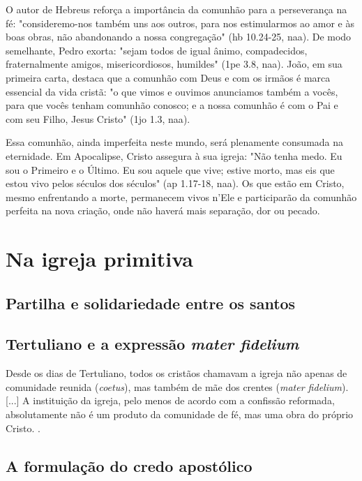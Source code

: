 O autor de Hebreus reforça a importância da comunhão para a perseverança na fé: "consideremo-nos também uns aos outros, para nos estimularmos ao amor e às boas obras, não abandonando a nossa congregação" (\gls{hb} 10.24-25, \gls{naa}). De modo semelhante, Pedro exorta: "sejam todos de igual ânimo, compadecidos, fraternalmente amigos, misericordiosos, humildes" (\gls{1pe} 3.8, \gls{naa}). João, em sua primeira carta, destaca que a comunhão com Deus e com os irmãos é marca essencial da vida cristã: "o que vimos e ouvimos anunciamos também a vocês, para que vocês tenham comunhão conosco; e a nossa comunhão é com o Pai e com seu Filho, Jesus Cristo" (\gls{1jo} 1.3, \gls{naa}).

Essa comunhão, ainda imperfeita neste mundo, será plenamente consumada na eternidade. Em Apocalipse, Cristo assegura à sua igreja: "Não tenha medo. Eu sou o Primeiro e o Último. Eu sou aquele que vive; estive morto, mas eis que estou vivo pelos séculos dos séculos" (\gls{ap} 1.17-18, \gls{naa}). Os que estão em Cristo, mesmo enfrentando a morte, permanecem vivos n’Ele e participarão da comunhão perfeita na nova criação, onde não haverá mais separação, dor ou pecado.

\section{Na igreja primitiva}

\subsection{Partilha e solidariedade entre os santos}

\subsection{Tertuliano e a expressão \textit{mater fidelium}}
\begin{citacao}
Desde os dias de Tertuliano, todos os cristãos chamavam a igreja não apenas de comunidade reunida (\textit{coetus}), mas também de mãe dos crentes (\textit{mater fidelium}). [...] A instituição da igreja, pelo menos de acordo com a confissão reformada, absolutamente não é um produto da comunidade de fé, mas uma obra do próprio Cristo. \cite[335]{bavinck2012}.
\end{citacao}

\subsection{A formulação do credo apostólico}

